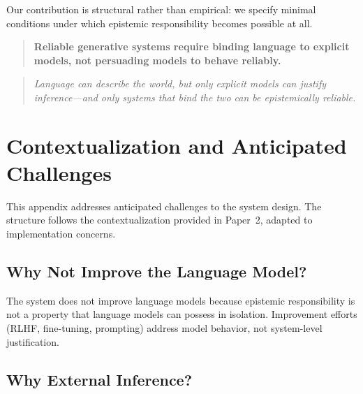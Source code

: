\documentclass[11pt,a4paper]{article}
\begin{document}
Our contribution is structural rather than empirical: we specify minimal conditions under which epistemic responsibility becomes possible at all.

\begin{quote}
\textbf{Reliable generative systems require binding language to explicit models, not persuading models to behave reliably.}
\end{quote}

\begin{quote}
\textit{Language can describe the world, but only explicit models can justify inference---and only systems that bind the two can be epistemically reliable.}
\end{quote}






\appendix

\section{Contextualization and Anticipated Challenges}

This appendix addresses anticipated challenges to the system design. The structure follows the contextualization provided in Paper~2, adapted to implementation concerns.

\subsection{Why Not Improve the Language Model?}

The system does not improve language models because epistemic responsibility is not a property that language models can possess in isolation. Improvement efforts (RLHF, fine-tuning, prompting) address model behavior, not system-level justification.

\subsection{Why External Inference?}
\end{document}
